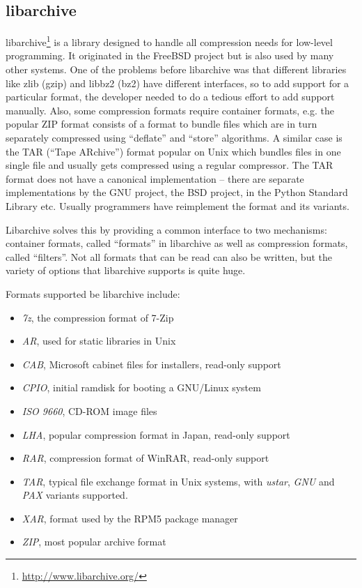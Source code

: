 \documentclass[parskip=half]{scrreprt}
\begin{document}
\subsection{libarchive}
\label{sec:libarchive}

libarchive\footnote{\url{http://www.libarchive.org/}} is a library designed to
handle all compression needs for low-level programming. It originated in the
FreeBSD project but is also used by many other systems. One of the problems
before libarchive was that different libraries like zlib (gzip) and libbz2
(bz2) have different interfaces, so to add support for a particular format, the
developer needed to do a tedious effort to add support manually. Also, some
compression formats require container formats, e.g. the popular ZIP format
consists of a format to bundle files which are in turn separately compressed
using \enquote{deflate} and \enquote{store} algorithms. A similar case is the
TAR (\enquote{Tape ARchive}) format popular on Unix which bundles files in one
single file and usually gets compressed using a regular compressor. The TAR
format does not have a canonical implementation -- there are separate
implementations by the GNU project, the BSD project, in the Python Standard
Library etc. Usually programmers have reimplement the format and its variants.

Libarchive solves this by providing a common interface to two mechanisms:
container formats, called \enquote{formats} in libarchive as well as
compression formats, called \enquote{filters}. Not all formats that can be read
can also be written, but the variety of options that libarchive supports is
quite huge.

Formats supported be libarchive include:

\begin{itemize}
  \item \emph{7z}, the compression format of 7-Zip
  \item \emph{AR}, used for static libraries in Unix
  \item \emph{CAB}, Microsoft cabinet files for installers, read-only support
  \item \emph{CPIO}, initial ramdisk for booting a GNU/Linux system
  \item \emph{ISO 9660}, CD-ROM image files
  \item \emph{LHA}, popular compression format in Japan, read-only support
  \item \emph{RAR}, compression format of WinRAR, read-only support
  \item \emph{TAR}, typical file exchange format in Unix systems, with
    \emph{ustar}, \emph{GNU} and \emph{PAX} variants supported.
  \item \emph{XAR}, format used by the RPM5 package manager
  \item \emph{ZIP}, most popular archive format
\end{itemize}
\end{document}
